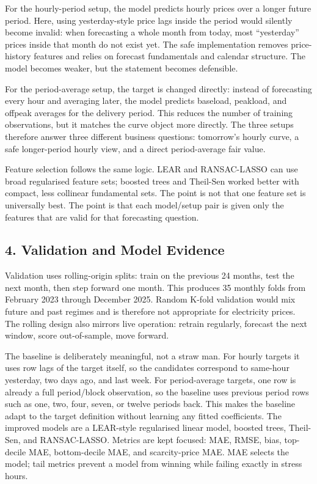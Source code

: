 \documentclass[10pt,a4paper]{article}
\begin{document}
For the hourly-period setup, the model predicts hourly prices over a longer future period. Here, using yesterday-style price lags inside the period would silently become invalid: when forecasting a whole month from today, most ``yesterday'' prices inside that month do not exist yet. The safe implementation removes price-history features and relies on forecast fundamentals and calendar structure. The model becomes weaker, but the statement becomes defensible.

For the period-average setup, the target is changed directly: instead of forecasting every hour and averaging later, the model predicts baseload, peakload, and offpeak averages for the delivery period. This reduces the number of training observations, but it matches the curve object more directly. The three setups therefore answer three different business questions: tomorrow's hourly curve, a safe longer-period hourly view, and a direct period-average fair value.

Feature selection follows the same logic. LEAR and RANSAC-LASSO can use broad regularised feature sets; boosted trees and Theil-Sen worked better with compact, less collinear fundamental sets. The point is not that one feature set is universally best. The point is that each model/setup pair is given only the features that are valid for that forecasting question.

\subsection*{4. Validation and Model Evidence}
Validation uses rolling-origin splits: train on the previous 24 months, test the next month, then step forward one month. This produces 35 monthly folds from February 2023 through December 2025. Random K-fold validation would mix future and past regimes and is therefore not appropriate for electricity prices. The rolling design also mirrors live operation: retrain regularly, forecast the next window, score out-of-sample, move forward.

The baseline is deliberately meaningful, not a straw man. For hourly targets it uses row lags of the target itself, so the candidates correspond to same-hour yesterday, two days ago, and last week. For period-average targets, one row is already a full period/block observation, so the baseline uses previous period rows such as one, two, four, seven, or twelve periods back. This makes the baseline adapt to the target definition without learning any fitted coefficients. The improved models are a LEAR-style regularised linear model, boosted trees, Theil-Sen, and RANSAC-LASSO. Metrics are kept focused: MAE, RMSE, bias, top-decile MAE, bottom-decile MAE, and scarcity-price MAE. MAE selects the model; tail metrics prevent a model from winning while failing exactly in stress hours.
\end{document}

